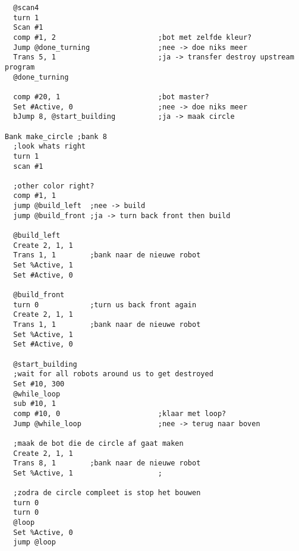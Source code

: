 \documentclass[10pt]{article}
\begin{document}
\begin{verbatim}
  @scan4
  turn 1
  Scan #1
  comp #1, 2                        ;bot met zelfde kleur?
  Jump @done_turning                ;nee -> doe niks meer
  Trans 5, 1                        ;ja -> transfer destroy upstream program 
  @done_turning
  
  comp #20, 1                       ;bot master?
  Set #Active, 0                    ;nee -> doe niks meer
  bJump 8, @start_building          ;ja -> maak circle

Bank make_circle ;bank 8
  ;look whats right
  turn 1
  scan #1
  
  ;other color right?
  comp #1, 1 
  jump @build_left  ;nee -> build 
  jump @build_front ;ja -> turn back front then build 

  @build_left
  Create 2, 1, 1
  Trans 1, 1        ;bank naar de nieuwe robot
  Set %Active, 1
  Set #Active, 0
  
  @build_front
  turn 0            ;turn us back front again
  Create 2, 1, 1
  Trans 1, 1        ;bank naar de nieuwe robot
  Set %Active, 1
  Set #Active, 0
  
  @start_building
  ;wait for all robots around us to get destroyed
  Set #10, 300
  @while_loop
  sub #10, 1
  comp #10, 0                       ;klaar met loop?
  Jump @while_loop                  ;nee -> terug naar boven

  ;maak de bot die de circle af gaat maken
  Create 2, 1, 1
  Trans 8, 1        ;bank naar de nieuwe robot
  Set %Active, 1                    ;
  
  ;zodra de circle compleet is stop het bouwen
  turn 0
  turn 0
  @loop
  Set %Active, 0
  jump @loop
\end{verbatim}
\end{document}

